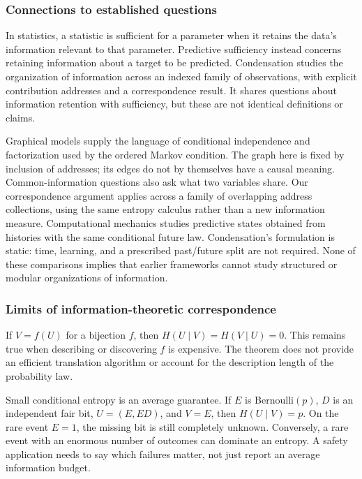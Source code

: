 \documentclass[11pt]{article}
\begin{document}
\subsubsection{Connections to established questions}
In statistics, a statistic is sufficient for a parameter when it
retains the data's information relevant to that parameter. Predictive
sufficiency instead concerns retaining information about a target to be
predicted. Condensation studies the organization of information across an
indexed family of observations, with explicit contribution addresses and a
correspondence result. It shares questions about information retention with
sufficiency, but these are not identical definitions or claims.

Graphical models supply the language of conditional independence and
factorization used by the ordered Markov condition. The graph here is fixed by
inclusion of addresses; its edges do not by themselves have a causal meaning.
Common-information questions also ask what two variables share. Our
correspondence argument applies across a family of overlapping address
collections, using the same entropy calculus rather than a new information
measure. Computational mechanics studies predictive states obtained from
histories with the same conditional future law. Condensation's formulation is
static: time, learning, and a prescribed past/future split are not required.
None of these comparisons implies that earlier frameworks cannot study
structured or modular organizations of information.

\subsubsection{Limits of information-theoretic correspondence}
If $V=f(U)$ for a bijection $f$, then
$H(U\mid V)=H(V\mid U)=0$. This remains true when describing or discovering
$f$ is expensive. The theorem does not provide an efficient translation
algorithm or account for the description length of the probability law.

Small conditional entropy is an average guarantee. If $E$ is Bernoulli$(p)$,
$D$ is an independent fair bit, $U=(E,ED)$, and $V=E$, then $H(U\mid V)=p$.
On the rare event $E=1$, the missing bit is still completely unknown.
Conversely, a rare event with an enormous number of outcomes can dominate an
entropy. A safety application needs to say which failures matter, not just
report an average information budget.
\end{document}
